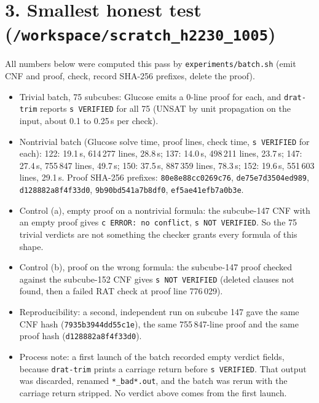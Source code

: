 \documentclass[11pt]{article}
\begin{document}
\section*{3. Smallest honest test (\texttt{/workspace/scratch\_h2230\_1005})}
All numbers below were computed this pass by \texttt{experiments/batch.sh} (emit CNF and proof, check, record SHA-256 prefixes, delete the proof).
\begin{itemize}
\item Trivial batch, 75 subcubes: Glucose emits a 0-line proof for each, and \texttt{drat-trim} reports \texttt{s VERIFIED} for all 75 (UNSAT by unit propagation on the input, about 0.1 to 0.25\,s per check).
\item Nontrivial batch (Glucose solve time, proof lines, check time, \texttt{s VERIFIED} for each):
  122: 19.1\,s, 614\,277 lines, 28.8\,s;
  137: 14.0\,s, 498\,211 lines, 23.7\,s;
  147: 27.4\,s, 755\,847 lines, 49.7\,s;
  150: 37.5\,s, 887\,359 lines, 78.3\,s;
  152: 19.6\,s, 551\,603 lines, 29.1\,s.
  Proof SHA-256 prefixes: \texttt{80e8e88cc0269c76}, \texttt{de75e7d3504ed989}, \texttt{d128882a8f4f33d0}, \texttt{9b90bd541a7b8df0}, \texttt{ef5ae41efb7a0b3e}.
\item Control (a), empty proof on a nontrivial formula: the subcube-147 CNF with an empty proof gives \texttt{c ERROR: no conflict}, \texttt{s NOT VERIFIED}. So the 75 trivial verdicts are not something the checker grants every formula of this shape.
\item Control (b), proof on the wrong formula: the subcube-147 proof checked against the subcube-152 CNF gives \texttt{s NOT VERIFIED} (deleted clauses not found, then a failed RAT check at proof line 776\,029).
\item Reproducibility: a second, independent run on subcube 147 gave the same CNF hash (\texttt{7935b3944dd55c1e}), the same 755\,847-line proof and the same proof hash (\texttt{d128882a8f4f33d0}).
\item Process note: a first launch of the batch recorded empty verdict fields, because \texttt{drat-trim} prints a carriage return before \texttt{s VERIFIED}. That output was discarded, renamed \texttt{*\_bad*.out}, and the batch was rerun with the carriage return stripped. No verdict above comes from the first launch.
\end{itemize}
\end{document}
